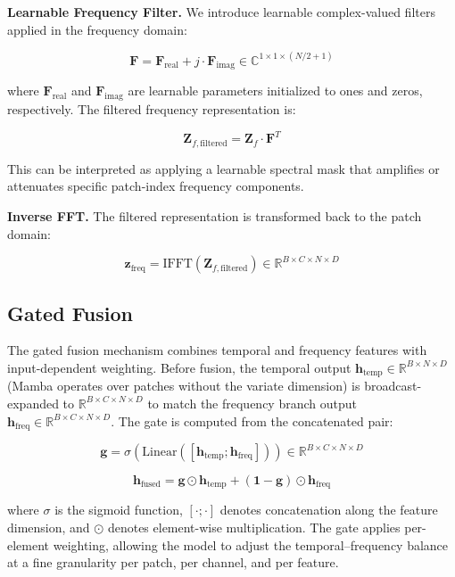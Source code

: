 \documentclass[symmetry,article,submit,pdftex,moreauthors]{Definitions/mdpi}
\begin{document}
\textbf{Learnable Frequency Filter.} We introduce learnable complex-valued filters applied in the frequency domain:
\begin{linenomath}
\begin{equation}
\mathbf{F} = \mathbf{F}_{\text{real}} + j \cdot \mathbf{F}_{\text{imag}} \in \mathbb{C}^{1 \times 1 \times (N/2+1)}
\end{equation}
\end{linenomath}
where $\mathbf{F}_{\text{real}}$ and $\mathbf{F}_{\text{imag}}$ are learnable parameters initialized to ones and zeros, respectively. The filtered frequency representation is:
\begin{linenomath}
\begin{equation}
\mathbf{Z}_{f,\text{filtered}} = \mathbf{Z}_f \cdot \mathbf{F}^T
\end{equation}
\end{linenomath}
This can be interpreted as applying a learnable spectral mask that amplifies or attenuates specific patch-index frequency components.

\textbf{Inverse FFT.} The filtered representation is transformed back to the patch domain:
\begin{linenomath}
\begin{equation}
\mathbf{z}_{\text{freq}} = \text{IFFT}(\mathbf{Z}_{f,\text{filtered}}) \in \mathbb{R}^{B \times C \times N \times D}
\end{equation}
\end{linenomath}

\subsection{Gated Fusion}

The gated fusion mechanism combines temporal and frequency features with input-dependent weighting. Before fusion, the temporal output $\mathbf{h}_{\text{temp}} \in \mathbb{R}^{B \times N \times D}$ (Mamba operates over patches without the variate dimension) is broadcast-expanded to $\mathbb{R}^{B \times C \times N \times D}$ to match the frequency branch output $\mathbf{h}_{\text{freq}} \in \mathbb{R}^{B \times C \times N \times D}$. The gate is computed from the concatenated pair:
\begin{linenomath}
\begin{equation}
\mathbf{g} = \sigma(\text{Linear}([\mathbf{h}_{\text{temp}}; \mathbf{h}_{\text{freq}}])) \in \mathbb{R}^{B \times C \times N \times D}
\end{equation}
\end{linenomath}
\begin{linenomath}
\begin{equation}
\mathbf{h}_{\text{fused}} = \mathbf{g} \odot \mathbf{h}_{\text{temp}} + (\mathbf{1} - \mathbf{g}) \odot \mathbf{h}_{\text{freq}}
\end{equation}
\end{linenomath}
where $\sigma$ is the sigmoid function, $[\cdot;\cdot]$ denotes concatenation along the feature dimension, and $\odot$ denotes element-wise multiplication. The gate applies per-element weighting, allowing the model to adjust the temporal--frequency balance at a fine granularity per patch, per channel, and per feature.
\end{document}
